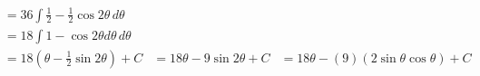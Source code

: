 \documentclass[preview]{standalone}
\begin{document}
\begin{align*}
&=36 \int \frac{1}{2} - \frac{1}{2}\cos2\theta \, d\theta \\ &=18 \int 1-\cos2\theta d\theta \, d\theta \\ &=18(\theta-\frac{1}{2}\sin2\theta) + C &=18\theta-9\sin2\theta +C &=18\theta-(9)(2\sin\theta\cos\theta) + C
\end{align*}
\end{document}
